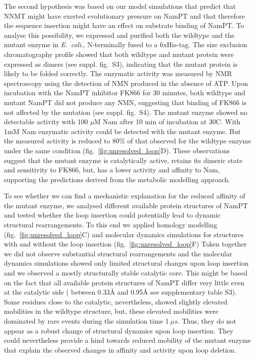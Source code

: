 The second hypothesis was  based on our model simulations that predict that NNMT might have exerted evolutionary pressure on  NamPT and that therefore the sequence insertion might have an effect on substrate binding of NamPT.  To analyse this possibility, we expressed and purified  both the wildtype and the mutant enzyme in \textit{E.~coli}., N-terminally fused to a 6xHis-tag. The size exclusion chromatography profile showed that both wildtype and mutant protein were expressed as dimers (see suppl. fig.~S3), indicating that the  mutant protein is likely to be folded correctly. The enzymatic activity was measured by NMR spectroscopy using the detection of NMN produced in the absence of ATP. Upon incubation with the NamPT inhibitor FK866 \cite{Hasmann2003} for 30 minutes, both wildtype and mutant NamPT did not produce any NMN, suggesting that binding of FK866 is not affected by the mutation (see suppl. fig.~S4). The mutant enzyme showed no detectable activity with 100 $\mu$M  Nam after 10 min of incubation at 30\textdegree{}C. With 1mM Nam enzymatic activity could be detected with the mutant enzyme. But the measured activity is reduced to 80\% of that observed for the wildtype enzyme under the same condition (fig.~\ref{fig:unresolved_loop}D). These observations suggest that the mutant enzyme is catalytically active, retains its dimeric state and sensitivity to FK866, but, has a  lower activity and affinity to Nam, supporting the predictions derived from the metabolic modelling approach.

To see whether we can find a mechanistic explanation for the reduced affinity of the mutant enzyme, we analysed different available protein structures of NamPT and tested whether  the loop insertion could potentially lead to dynamic structural rearrangements. To this end we applied homology modelling (fig.~\ref{fig:unresolved_loop}C) and molecular dynamics simulations for structures with and without the loop insertion (fig.~\ref{fig:unresolved_loop}F) Taken together we did not observe substantial structural rearrangements and the molecular dynamics simulations showed only limited structural changes upon loop insertion and we observed a mostly structurally stable catalytic core. This might be based on the fact that  all available protein structures of NamPT differ very little even at the catalytic side ( between 0.33Å and 0.95Å see supplementary table S3). Some residues close to the catalytic, nevertheless, showed slightly elevated mobilities in the wildtype structure, but, these elevated mobilities were dominated by rare events during the simulation time 1$~\mu s$. Thus, they do not appear as a robust change of structural dynamics upon loop insertion. They could nevertheless provide a hind towards reduced mobility of the mutant enzyme that explain the observed changes in affinity and activity upon loop deletion.





